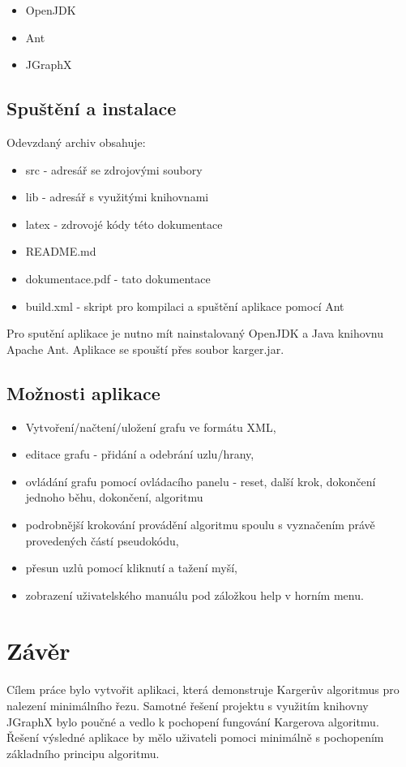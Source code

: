 \documentclass[../projekt.tex]{subfiles}
\begin{document}
\begin{itemize}
	\item OpenJDK
	\item Ant 
	\item JGraphX
\end{itemize}


\subsection{Spuštění a instalace}

Odevzdaný archiv obsahuje:

\begin{itemize}
	\item src - adresář se zdrojovými soubory
	\item lib - adresář s využitými knihovnami
	\item latex - zdrovojé kódy této dokumentace 
	\item README.md
	\item dokumentace.pdf - tato dokumentace 
	\item build.xml - skript pro kompilaci a spuštění aplikace pomocí Ant
\end{itemize}

\noindent Pro sputění aplikace je nutno mít nainstalovaný OpenJDK a Java knihovnu Apache Ant. Aplikace se spouští přes soubor karger.jar.


\subsection{Možnosti aplikace}

\begin{itemize}
	\item Vytvoření/načtení/uložení grafu ve formátu XML,
	\item editace grafu - přidání a odebrání uzlu/hrany,
	\item ovládání grafu pomocí ovládacího panelu - reset, další krok, dokončení jednoho běhu, dokončení, algoritmu
	\item podrobnější krokování provádění algoritmu spoulu s vyznačením právě provedených částí pseudokódu,
	\item přesun uzlů pomocí kliknutí a tažení myší,
	\item zobrazení uživatelského manuálu pod záložkou help v horním menu.
\end{itemize}



\section{Závěr}

Cílem práce bylo vytvořit aplikaci, která demonstruje Kargerův algoritmus pro nalezení minimálního řezu. Samotné řešení projektu s využitím knihovny JGraphX bylo poučné a vedlo k pochopení fungování Kargerova algoritmu. Řešení výsledné aplikace by mělo uživateli pomoci minimálně s pochopením základního principu algoritmu.
\end{document}
